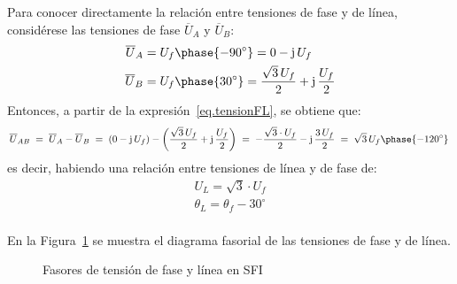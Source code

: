 	Para conocer directamente la relación entre tensiones de fase y de línea, considérese las tensiones de fase $\overline{U}_A$ y $\overline{U}_B$: 
	\begin{align*}
		\overline{U}_A &= U_f\phase{-90^\circ}=0-\mathrm{j}\,U_f
		\\
		\overline{U}_B &= U_f\phase{30^\circ}=\dfrac{\sqrt{3}\,U_f}{2}+\mathrm{j}\,\dfrac{U_f}{2}
	\end{align*}
	Entonces, a partir de la expresión~\eqref{eq.tensionFL}, se obtiene que: 
	\begin{equation*}
		\overline{U}_{AB} \;=\; \overline{U}_{A}-\overline{U}_{B} \;=\; (0-\mathrm{j}\,U_f)-\left(\dfrac{\sqrt{3}\,U_f}{2}+\mathrm{j}\,\dfrac{U_f}{2}\right) \;=\; -\dfrac{\sqrt{3}\cdot U_f}{2}-\mathrm{j}\,\dfrac{3\,U_f}{2} \;=\; \sqrt{3}\,U_f \phase{-120^\circ}\,
	\end{equation*}
	es decir, habiendo una relación entre tensiones de línea y de fase de: 
	\begin{equation}\label{eq.sfi_fase-linea}
		\boxed{
			\begin{array}{l}
				U_L = \sqrt{3}\cdot U_f\\
				\theta_L = \theta_f - 30^\circ\\
			\end{array}
		} 
	\end{equation}
	
	En la Figura~\ref{fig.linea-fase-SFI} se muestra el diagrama fasorial de las tensiones de fase y de línea. 

	\begin{figure}[H]
		\centering
		\hfil
		\caption{Fasores de tensión de fase y línea en SFI}
		\label{fig.linea-fase-SFI}
	\end{figure}
	
